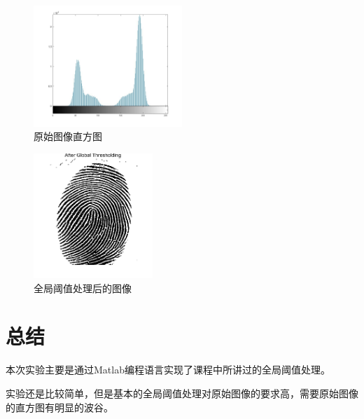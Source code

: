 \documentclass{../source/Experiment}
\begin{document}
        \begin{figure}[H]
            \centering
            \includegraphics[width = 0.5\textwidth]{第五次/lab5-2.jpg}
            \caption{原始图像直方图}
        \end{figure}

        \begin{figure}[H]
            \centering
            \includegraphics[width = 0.4\textwidth]{第五次/lab5-3.jpg}
            \caption{全局阈值处理后的图像}
        \end{figure}


    \section{总结}
    本次实验主要是通过Matlab编程语言实现了课程中所讲过的全局阈值处理。

    实验还是比较简单，但是基本的全局阈值处理对原始图像的要求高，需要原始图像的直方图有明显的波谷。
\end{document}
